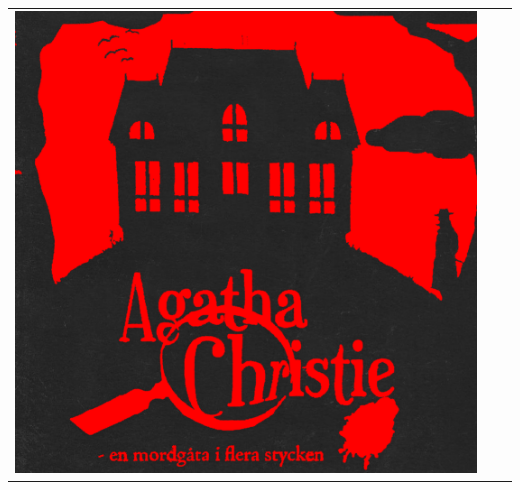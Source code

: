 \begin{tabular}{c c c}
\includegraphics[width=\gamlaAffischerLength]{Bilder/TidigareSpexloggor/AgathaIcon}\\


\end{tabular}
